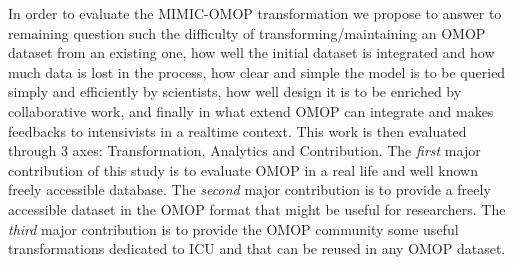 In order to evaluate the MIMIC-OMOP transformation we propose to answer to
remaining question such the difficulty of transforming/maintaining an OMOP
dataset from an existing one, how well the initial dataset is integrated and
how much data is lost in the process, how clear and simple the model is to be
queried simply and efficiently by scientists, how well design it is to be
enriched by collaborative work, and finally in what extend OMOP can integrate
and makes feedbacks to intensivists in a realtime context.  This work is then
evaluated through 3 axes: Transformation, Analytics and Contribution.
The \emph{first} major contribution of this study is to evaluate OMOP in a real
life and well known freely accessible database. The \emph{second} major
contribution is to provide a freely accessible dataset in the OMOP format that
might be useful for researchers. The \emph{third} major contribution is to
provide the OMOP community some useful transformations dedicated to ICU and
that can be reused in any OMOP dataset.
